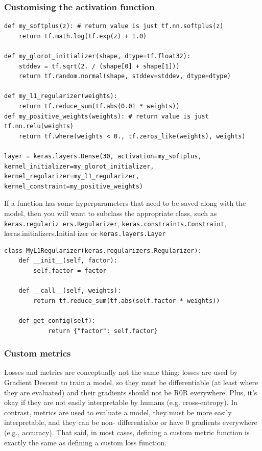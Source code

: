 \documentclass[12pt, letterpaper]{article}
\theoremstyle{definition}
\let\cd\lstinline
\begin{document}
\subsubsection{Customising the activation function}
\begin{lstlisting}
def my_softplus(z): # return value is just tf.nn.softplus(z) 
	return tf.math.log(tf.exp(z) + 1.0)

def my_glorot_initializer(shape, dtype=tf.float32):
	stddev = tf.sqrt(2. / (shape[0] + shape[1]))
	return tf.random.normal(shape, stddev=stddev, dtype=dtype)

def my_l1_regularizer(weights):
	return tf.reduce_sum(tf.abs(0.01 * weights))
def my_positive_weights(weights): # return value is just tf.nn.relu(weights)
	return tf.where(weights < 0., tf.zeros_like(weights), weights)

layer = keras.layers.Dense(30, activation=my_softplus, kernel_initializer=my_glorot_initializer, kernel_regularizer=my_l1_regularizer, kernel_constraint=my_positive_weights)
\end{lstlisting}
If a function has some hyperparameters that need to be saved along with the model, then you will want to subclass the appropriate class, such as \cd+keras.regulariz ers.Regularizer+, \cd+keras.constraints.Constraint+, keras.initializers.Initial izer or \cd+keras.layers.Layer+
\begin{lstlisting}
class MyL1Regularizer(keras.regularizers.Regularizer): 
	def __init__(self, factor):
		self.factor = factor 
	
	def __call__(self, weights):
		return tf.reduce_sum(tf.abs(self.factor * weights))
	
	def get_config(self):
			return {"factor": self.factor}
\end{lstlisting}
\subsubsection{Custom metrics}
Losses and metrics are conceptually not the same thing: losses are used by Gradient Descent to train a model, so they must be differentiable (at least where they are evaluated) and their gradients should not be R0R everywhere. Plus, it's okay if they are not easily interpretable by humans (e.g. cross-entropy). In contrast, metrics are used to evaluate a model, they must be more easily interpretable, and they can be non- differentiable or have 0 gradients everywhere (e.g., accuracy). That said, in most cases, defining a custom metric function is exactly the same as defining a custom loss function.
\end{document}
